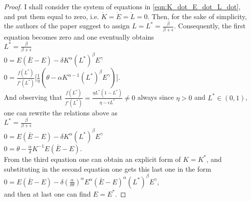 \begin{proof}
	I shall consider the system of equations in \eqref{eqn:K_dot_E_dot_L_dot}, and put them equal to zero, i.e. $\dot{K}=\dot{E}=\dot{L}=0$. Then, for the sake of simplicity, the authors of the paper suggest to assign $L=L^*=\frac{\beta}{\beta+\epsilon}$. Consequently, the first equation becomes zero and one eventually obtains \\
	$L^* = \frac{\beta}{\beta+\epsilon}$\\
	$0=E(\bar{E}-E)-\delta K^\alpha (L^*)^\beta E^\gamma$\\
	$0=\frac{f(L^*)}{f'(L^*)}\Big[\frac{1}{\eta}(\theta-\alpha K^{\alpha-1}(L^*)^\beta E^\gamma) \Big]$.\\
	And observing that $\frac{f(L^*)}{f'(L^*)}=\frac{\eta L^*(1-L^*)}{\eta-\epsilon L^*}\neq0$ always since $\eta>0$ and $L^* \in (0,1)$, one can rewrite the relations above as \\
	$L^* = \frac{\beta}{\beta+\epsilon}$\\
	$0=E(\bar{E}-E)-\delta K^\alpha (L^*)^\beta E^\gamma$\\
	$0=\theta-\frac{\alpha}{\delta} K^{-1}E(\bar{E}-E)$.\\
	From the third equation one can obtain an explicit form of $K=K^*$, and substituting in the second equation one gets this last one in the form \\
	$0=E(\bar{E}-E)-\delta(\frac{\alpha}{\delta\theta})^\alpha E^\alpha(\bar{E}-E)^\alpha (L^*)^\beta E^\gamma$, \\
	and then at last one can find $E=E^*$.
	

\end{proof}
